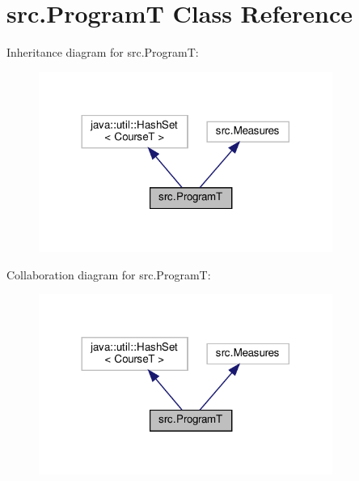 \hypertarget{classsrc_1_1ProgramT}{}\section{src.\+ProgramT Class Reference}
\label{classsrc_1_1ProgramT}


Inheritance diagram for src.\+ProgramT\+:
\nopagebreak
\begin{figure}[H]
\begin{center}
\leavevmode
\includegraphics[width=272pt]{classsrc_1_1ProgramT__inherit__graph}
\end{center}
\end{figure}


Collaboration diagram for src.\+ProgramT\+:
\nopagebreak
\begin{figure}[H]
\begin{center}
\leavevmode
\includegraphics[width=272pt]{classsrc_1_1ProgramT__coll__graph}
\end{center}
\end{figure}
